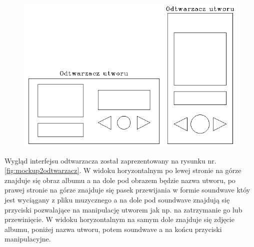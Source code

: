 \begin{figure}[H]
	\centering
	\includegraphics[width=1\linewidth]{images/mockup3_odtwarzacz}
	\caption{}
	\label{fig:mockup3odtwarzacz}
\end{figure}

Wygląd interfejsu odtwarzacza został zaprezentowany na rysunku nr.\ref{fig:mockup2odtwarzacz}. W widoku horyzontalnym po lewej stronie na górze znajduje się obraz albumu a na dole pod obrazem będzie nazwa utworu, po prawej stronie na górze znajduje się pasek przewijania w formie soundwave któy jest wyciągany z pliku muzycznego a na dole pod soundwave znajdują się przyciski pozwalające na manipulację utworem jak np. na zatrzymanie go lub przewinięcie. W widoku horyzontalnym na samym dole znajduje się zdjęcie albumu, poniżej nazwa utworu, potem soundwave a na końcu przyciski manipulacyjne.
